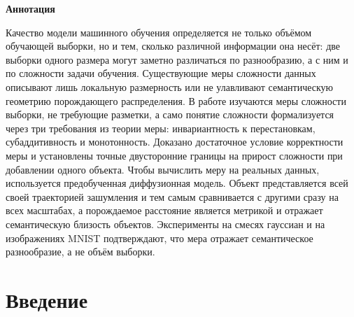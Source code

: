 \documentclass[14pt, a4paper]{extarticle}
\theoremstyle{definition}
\theoremstyle{plain}
\begin{document}
\newpage
\begingroup
\hypersetup{linkcolor=black}
\tableofcontents
\endgroup

\newpage
\begin{center}
    \Large\textbf{Аннотация}
\end{center}

\noindent
Качество модели машинного обучения определяется не только объёмом обучающей
выборки, но и тем, сколько различной информации она несёт: две выборки одного
размера могут заметно различаться по разнообразию, а с ним и по сложности задачи
обучения. Существующие меры сложности данных описывают лишь локальную размерность
или не улавливают семантическую геометрию порождающего распределения. В работе изучаются меры сложности выборки,
не требующие разметки, а само понятие сложности формализуется через три требования из
теории меры: инвариантность к перестановкам, субаддитивность и монотонность. Доказано достаточное условие корректности меры
и установлены точные двусторонние границы на прирост сложности при добавлении
одного объекта. Чтобы вычислить меру на реальных данных, используется
предобученная диффузионная модель. Объект представляется всей своей траекторией
зашумления и тем самым сравнивается с другими сразу на всех масштабах, а
порождаемое расстояние является метрикой и отражает семантическую близость
объектов. Эксперименты на смесях гауссиан и на изображениях MNIST подтверждают,
что мера отражает семантическое разнообразие, а не объём выборки.

\newpage
\section{Введение}
\label{sec:intro}
\end{document}
